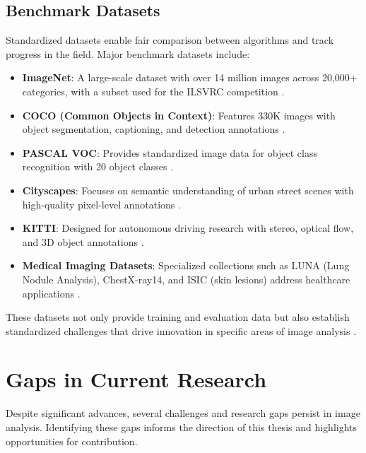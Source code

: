 \subsection{Benchmark Datasets}
Standardized datasets enable fair comparison between algorithms and track progress in the field. Major benchmark datasets include:

\begin{itemize}
    \item \textbf{ImageNet}: A large-scale dataset with over 14 million images across 20,000+ categories, with a subset used for the ILSVRC competition \cite{deng2009imagenet}.
    
    \item \textbf{COCO (Common Objects in Context)}: Features 330K images with object segmentation, captioning, and detection annotations \cite{lin2014microsoft}.
    
    \item \textbf{PASCAL VOC}: Provides standardized image data for object class recognition with 20 object classes \cite{everingham2010pascal}.
    
    \item \textbf{Cityscapes}: Focuses on semantic understanding of urban street scenes with high-quality pixel-level annotations \cite{cordts2016cityscapes}.
    
    \item \textbf{KITTI}: Designed for autonomous driving research with stereo, optical flow, and 3D object annotations \cite{geiger2013vision}.
    
    \item \textbf{Medical Imaging Datasets}: Specialized collections such as LUNA (Lung Nodule Analysis), ChestX-ray14, and ISIC (skin lesions) address healthcare applications \cite{setio2017validation, wang2017chestx}.
\end{itemize}

These datasets not only provide training and evaluation data but also establish standardized challenges that drive innovation in specific areas of image analysis \cite{russakovsky2015imagenet}.

\section{Gaps in Current Research}
Despite significant advances, several challenges and research gaps persist in image analysis. Identifying these gaps informs the direction of this thesis and highlights opportunities for contribution.

